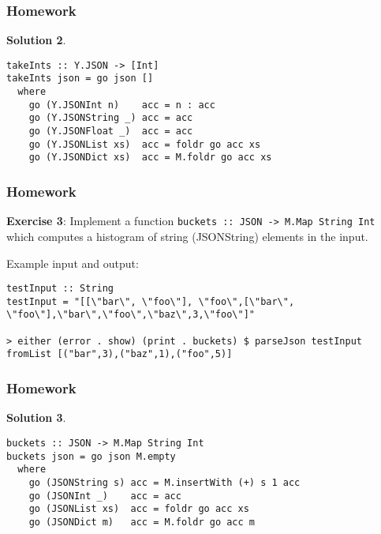 \documentclass{beamer}
\begin{document}
\begin{frame}[fragile]
\frametitle{Homework}

\textbf{Solution 2}.

\bigskip

\begin{verbatim}
takeInts :: Y.JSON -> [Int]
takeInts json = go json []
  where
    go (Y.JSONInt n)    acc = n : acc
    go (Y.JSONString _) acc = acc
    go (Y.JSONFloat _)  acc = acc
    go (Y.JSONList xs)  acc = foldr go acc xs
    go (Y.JSONDict xs)  acc = M.foldr go acc xs
\end{verbatim}

\end{frame}


\begin{frame}[fragile]
\frametitle{Homework}

\textbf{Exercise 3}: Implement a function
\verb+buckets :: JSON -> M.Map String Int+ which computes a histogram
of string (JSONString) elements in the input.

\bigskip
Example input and output:

{\tiny
\begin{verbatim}
testInput :: String
testInput = "[[\"bar\", \"foo\"], \"foo\",[\"bar\", \"foo\"],\"bar\",\"foo\",\"baz\",3,\"foo\"]"

> either (error . show) (print . buckets) $ parseJson testInput
fromList [("bar",3),("baz",1),("foo",5)]

\end{verbatim}
}
\end{frame}


\begin{frame}[fragile]
\frametitle{Homework}

\textbf{Solution 3}.

\bigskip

\begin{verbatim}
buckets :: JSON -> M.Map String Int
buckets json = go json M.empty
  where
    go (JSONString s) acc = M.insertWith (+) s 1 acc
    go (JSONInt _)    acc = acc
    go (JSONList xs)  acc = foldr go acc xs
    go (JSONDict m)   acc = M.foldr go acc m
\end{verbatim}

\end{frame}
\end{document}
